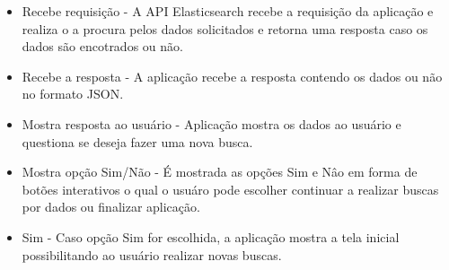 \begin{itemize}
	\item Recebe requisição - A API Elasticsearch recebe a requisição da aplicação e realiza o a procura pelos dados solicitados e retorna uma resposta caso os dados são encotrados ou não.
	\item Recebe a resposta - A aplicação recebe a resposta contendo os dados ou não no formato JSON.
	\item Mostra resposta ao usuário - Aplicação mostra os dados ao usuário e questiona se deseja fazer uma nova busca.
	\item Mostra opção Sim/Não - É mostrada as opções Sim e Nâo em forma de botões interativos o qual o usuáro pode escolher continuar a realizar buscas por dados ou finalizar aplicação.
	\item Sim - Caso opção Sim for escolhida, a aplicação mostra a tela inicial possibilitando ao usuário realizar novas buscas.
\end{itemize}
